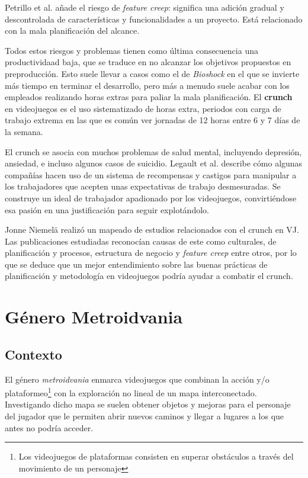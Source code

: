 Petrillo et al.\cite{petrillo} añade el riesgo de \textit{feature creep}: significa una adición gradual y descontrolada de características y funcionalidades a un proyecto. Está relacionado con la mala planificación del alcance.

Todos estos riesgos y problemas tienen como última consecuencia una productividaad baja, que se traduce en no alcanzar los objetivos propuestos en preproducción. Esto suele llevar a casos como el de \textit{Bioshock} en el que se invierte más tiempo en terminar el desarrollo, pero más a menudo suele acabar con los empleados realizando horas extras para paliar la mala planificación. El \textbf{crunch} en videojuegos es el uso sistematizado de horas extra, periodos con carga de trabajo extrema en las que es común ver jornadas de 12 horas entre 6 y 7 días de la semana.

El crunch se asocia con muchos problemas de salud mental, incluyendo depresión, ansiedad\cite{anderson}, e incluso algunos casos de suicidio\cite{kotakusuicide}. Legault et al.\cite{legault} describe cómo algunas compañías hacen uso de un sistema de recompensas y castigos para manipular a los trabajadores que acepten unas expectativas de trabajo desmesuradas. Se construye un ideal de trabajador apadionado por los videojuegos, convirtiéndose esa pasión en una justificación para seguir explotándolo.

Jonne Niemelä\cite{nimela} realizó un mapeado de estudios relacionados con el crunch en VJ. Las publicaciones estudiadas reconocían causas de este como culturales, de planificación y procesos, estructura de negocio y \textit{feature creep} entre otros, por lo que se deduce que un mejor entendimiento sobre las buenas prácticas de planificación y metodología en videojuegos podría ayudar a combatir el crunch.

\section{Género Metroidvania}

\subsection{Contexto}

El género \textit{metroidvania} enmarca videojuegos que combinan la acción y/o plataformeo\footnote{Los videojuegos de plataformas consisten en superar obstáculos a través del movimiento de un personaje} con la exploración no lineal de un mapa interconectado. Investigando dicho mapa se suelen obtener objetos y mejoras para el personaje del jugador que le permiten abrir nuevos caminos y llegar a lugares a los que antes no podría acceder.

